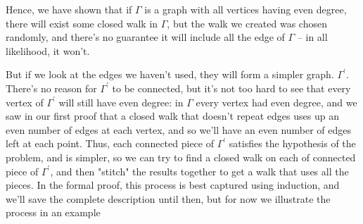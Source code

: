 \documentclass[10pt,]{book}
\theoremstyle{plain}
\theoremstyle{definition}
\theoremstyle{definition}
\theoremstyle{definition}
\theoremstyle{definition}
\numberwithin{equation}{section}
\begin{document}
\par
\hypertarget{p-134}{}%
Hence, we have shown that if \(\Gamma\) is a graph with all vertices having even degree, there will exist some closed walk in \(\Gamma\), but the walk we created was chosen randomly, and there's no guarantee it will include all the edge of \(\Gamma\) -- in all likelihood, it won't.%
\par
\hypertarget{p-135}{}%
But if we look at the edges we haven't used, they will form a simpler graph. \(\Gamma^\prime\).  There's no reason for \(\Gamma^\prime\) to be connected, but it's not too hard to see that every vertex of \(\Gamma^\prime\) will still have even degree: in \(\Gamma\) every vertex had even degree, and we saw in our first proof that a closed walk that doesn't repeat edges uses up an even number of edges at each vertex, and so we'll have an even number of edges left at each point.  Thus, each connected piece of \(\Gamma^\prime\) satisfies the hypothesis of the problem, and is simpler, so we can try to find a closed walk on each of connected piece of \(\Gamma^\prime\), and then "stitch" the results together to get a walk that uses all the pieces. In the formal proof, this process is best captured using induction, and we'll save the complete description until then, but for now we illustrate the process in an example%
\end{document}
